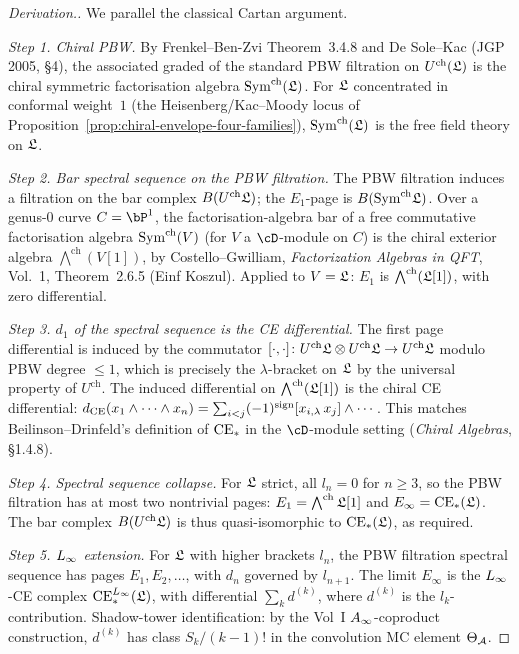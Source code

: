 \begin{proof}[Derivation.]
We parallel the classical Cartan argument.

\smallskip\noindent
\emph{Step 1. Chiral PBW.} By Frenkel--Ben-Zvi Theorem~3.4.8 and
De Sole--Kac (JGP 2005, \S 4), the associated graded of the
standard PBW filtration on $U^{\mathrm{ch}}(\mathfrak{L})$ is the chiral
symmetric factorisation algebra $\mathrm{Sym}^{\mathrm{ch}}(\mathfrak{L})$. For
$\mathfrak{L}$ concentrated in conformal weight~$1$ (the Heisenberg/Kac--Moody
locus of Proposition~\ref{prop:chiral-envelope-four-families}),
$\mathrm{Sym}^{\mathrm{ch}}(\mathfrak{L})$ is the free field theory on $\mathfrak{L}$.

\smallskip\noindent
\emph{Step 2. Bar spectral sequence on the PBW filtration.}
The PBW filtration induces a filtration on the bar complex
$B(U^{\mathrm{ch}}\mathfrak{L})$; the $E_1$-page is
$B(\mathrm{Sym}^{\mathrm{ch}}\mathfrak{L})$. Over a genus-$0$ curve $C = \bP^1$,
the factorisation-algebra bar of a free commutative
factorisation algebra $\mathrm{Sym}^{\mathrm{ch}}(V)$ (for $V$ a
$\cD$-module on $C$) is the chiral exterior algebra
$\bigwedge^{\mathrm{ch}}(V[1])$, by Costello--Gwilliam,
\emph{Factorization Algebras in QFT}, Vol.~1, Theorem~2.6.5
(Einf Koszul). Applied to $V = \mathfrak{L}$: $E_1$ is
$\bigwedge^{\mathrm{ch}}(\mathfrak{L}[1])$, with zero differential.

\smallskip\noindent
\emph{Step 3. $d_1$ of the spectral sequence is the CE
differential.} The first page differential is induced by the
commutator
$[\cdot,\cdot] \colon U^{\mathrm{ch}}\mathfrak{L} \otimes U^{\mathrm{ch}}\mathfrak{L}
 \to U^{\mathrm{ch}}\mathfrak{L}$ modulo PBW degree $\leq 1$, which is
precisely the $\lambda$-bracket on $\mathfrak{L}$ by the universal
property of $U^{\mathrm{ch}}$. The induced differential on
$\bigwedge^{\mathrm{ch}}(\mathfrak{L}[1])$ is the chiral CE differential:
$d_{\mathrm{CE}}(x_1 \wedge \cdots \wedge x_n) = \sum_{i < j}
(-1)^{\mathrm{sign}} [x_{i,\lambda}\, x_j] \wedge \cdots$.
This matches Beilinson--Drinfeld's definition of $\mathrm{CE}_*$ in the
$\cD$-module setting (\emph{Chiral Algebras}, \S 1.4.8).

\smallskip\noindent
\emph{Step 4. Spectral sequence collapse.}  For $\mathfrak{L}$ strict,
all $l_n = 0$ for $n \geq 3$, so the PBW filtration has at most
two nontrivial pages: $E_1 = \bigwedge^{\mathrm{ch}}\mathfrak{L}[1]$
and $E_\infty = \mathrm{CE}_*(\mathfrak{L})$. The bar complex
$B(U^{\mathrm{ch}}\mathfrak{L})$ is thus quasi-isomorphic to
$\mathrm{CE}_*(\mathfrak{L})$, as required.

\smallskip\noindent
\emph{Step 5. $L_\infty$ extension.}  For $\mathfrak{L}$ with higher brackets
$l_n$, the PBW filtration spectral sequence has pages
$E_1, E_2, \ldots$, with $d_n$ governed by $l_{n+1}$. The
limit $E_\infty$ is the $L_\infty$-CE complex $\mathrm{CE}_*^{L_\infty}(\mathfrak{L})$,
with differential $\sum_k d^{(k)}$, where $d^{(k)}$ is the
$l_k$-contribution.  Shadow-tower identification: by the Vol~I
$A_\infty$-coproduct construction, $d^{(k)}$ has class
$S_k / (k{-}1)!$ in the convolution MC element $\Theta_{\mathcal{A}}$.


\end{proof}
